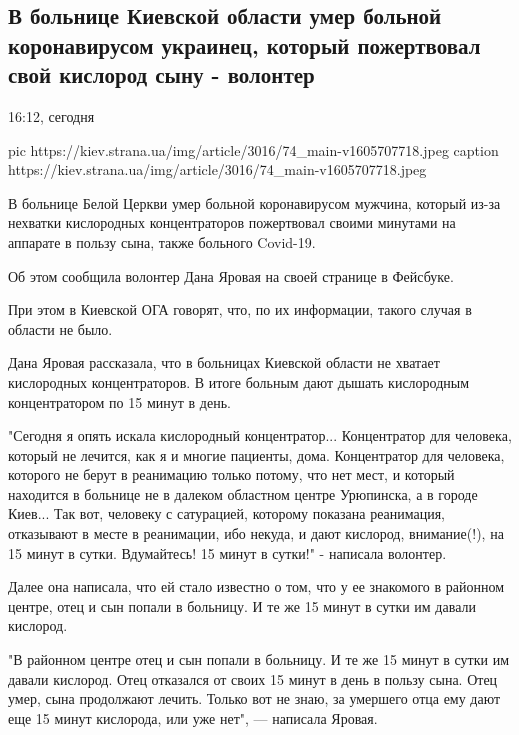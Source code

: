  
 
 

\subsection{В больнице Киевской области умер больной коронавирусом украинец, который пожертвовал свой кислород сыну - волонтер}

16:12, сегодня

\ifcmt
pic https://kiev.strana.ua/img/article/3016/74_main-v1605707718.jpeg
caption https://kiev.strana.ua/img/article/3016/74_main-v1605707718.jpeg
\fi

В больнице Белой Церкви умер больной коронавирусом мужчина, который из-за
нехватки кислородных концентраторов пожертвовал своими минутами на
аппарате в пользу сына, также больного Covid-19.

Об этом сообщила волонтер Дана Яровая на своей странице в Фейсбуке.

При этом в Киевской ОГА говорят, что, по их информации, такого случая в
области не было.

Дана Яровая рассказала, что в больницах Киевской области не хватает
кислородных концентраторов. В итоге больным дают дышать кислородным
концентратором по 15 минут в день.

"Сегодня я опять искала кислородный концентратор... Концентратор для
человека, который не лечится, как я и многие пациенты, дома. Концентратор
для человека, которого не берут в реанимацию только потому, что нет мест,
и который находится в больнице не в далеком областном центре Урюпинска, а
в городе Киев... Так вот, человеку с сатурацией, которому показана
реанимация, отказывают в месте в реанимации, ибо некуда, и дают кислород,
внимание(!), на 15 минут в сутки. Вдумайтесь! 15 минут в сутки!" -
написала волонтер.

Далее она написала, что ей стало известно о том, что у ее знакомого в
районном центре, отец и сын попали в больницу. И те же 15 минут в сутки им
давали кислород.

"В районном центре отец и сын попали в больницу. И те же 15 минут в сутки
им давали кислород. Отец отказался от своих 15 минут в день в пользу сына.
Отец умер, сына продолжают лечить. Только вот не знаю, за умершего отца
ему дают еще 15 минут кислорода, или уже нет", — написала Яровая.

